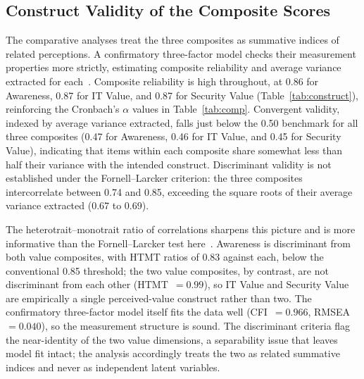 

\subsection{Construct Validity of the Composite Scores}

The comparative analyses treat the three composites as summative indices of related perceptions. A confirmatory three-factor model checks their measurement properties more strictly, estimating composite reliability and average variance extracted for each~\parencite{Fornell_Larcker_1981}. Composite reliability is high throughout, at 0.86 for Awareness, 0.87 for IT Value, and 0.87 for Security Value (Table~\ref{tab:construct}), reinforcing the Cronbach's $\alpha$ values in Table~\ref{tab:comp}. Convergent validity, indexed by average variance extracted, falls just below the 0.50 benchmark for all three composites (0.47 for Awareness, 0.46 for IT Value, and 0.45 for Security Value), indicating that items within each composite share somewhat less than half their variance with the intended construct. Discriminant validity is not established under the Fornell--Larcker criterion: the three composites intercorrelate between 0.74 and 0.85, exceeding the square roots of their average variance extracted (0.67 to 0.69).

The heterotrait--monotrait ratio of correlations sharpens this picture and is more informative than the Fornell--Larcker test here~\parencite{Henseler_Ringle_Sarstedt_2015}. Awareness is discriminant from both value composites, with HTMT ratios of 0.83 against each, below the conventional 0.85 threshold; the two value composites, by contrast, are not discriminant from each other (HTMT~$=0.99$), so IT Value and Security Value are empirically a single perceived-value construct rather than two. The confirmatory three-factor model itself fits the data well (CFI~$=0.966$, RMSEA~$=0.040$), so the measurement structure is sound. The discriminant criteria flag the near-identity of the two value dimensions, a separability issue that leaves model fit intact; the analysis accordingly treats the two as related summative indices and never as independent latent variables.



